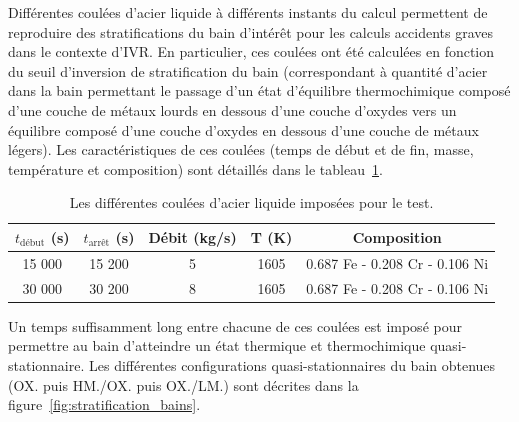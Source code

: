 Différentes coulées d'acier liquide à différents instants du calcul permettent de reproduire des stratifications du bain d'intérêt pour les calculs accidents graves dans le contexte d'IVR. En particulier, ces coulées ont été calculées en fonction du seuil d'inversion de stratification du bain (correspondant à quantité d'acier dans la bain permettant le passage d'un état d'équilibre thermochimique composé d'une couche de métaux lourds en dessous d'une couche d'oxydes vers un équilibre composé d'une couche d'oxydes en dessous d'une couche de métaux légers). Les caractéristiques de ces coulées (temps de début et de fin, masse, température et composition) sont détaillés dans le tableau~\ref{tab:coulees_acier}. 
\begin{table}
	\centering
	\begin{tabular}{ccccc} 
	\hline
	$t_{\text{début}}$ (s) &  $t_{\text{arrêt}}$ (s) & Débit (kg/s) & T (K) & Composition\\
	\hline
	15 000 & 15 200 & 5 & 1605 & 0.687 Fe - 0.208 Cr - 0.106 Ni\\
	30 000 & 30 200 & 8 & 1605 & 0.687 Fe - 0.208 Cr - 0.106 Ni\\
	\hline
	\end{tabular}	
	\caption{Les différentes coulées d'acier liquide imposées pour le test.} 
	\label{tab:coulees_acier}
\end{table}
Un temps suffisamment long entre chacune de ces coulées est imposé pour permettre au bain d'atteindre un état thermique et thermochimique quasi-stationnaire. Les différentes configurations quasi-stationnaires du bain obtenues (OX. puis HM./OX. puis OX./LM.) sont décrites dans la figure~\ref{fig:stratification_bains}.
